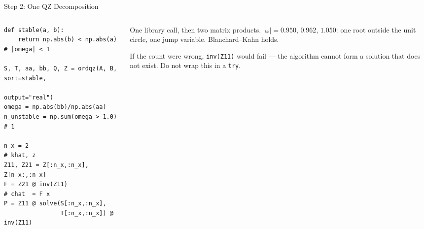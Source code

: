 \begin{frame}[fragile]{Step 2: One QZ Decomposition}
\begin{columns}[T]
\begin{column}{0.56\textwidth}
\begin{lstlisting}
def stable(a, b):
    return np.abs(b) < np.abs(a)   # |omega| < 1

S, T, aa, bb, Q, Z = ordqz(A, B, sort=stable,
                           output="real")
omega = np.abs(bb)/np.abs(aa)
n_unstable = np.sum(omega > 1.0)   # 1

n_x = 2                            # khat, z
Z11, Z21 = Z[:n_x,:n_x], Z[n_x:,:n_x]
F = Z21 @ inv(Z11)                 # chat  = F x
P = Z11 @ solve(S[:n_x,:n_x],
                T[:n_x,:n_x]) @ inv(Z11)
\end{lstlisting}
\end{column}
\begin{column}{0.41\textwidth}
\begin{conceptbox}[title=\textbf{The whole solve}]\small
One library call, then two matrix products. $|\omega|=0.950,\,0.962,\,\mathbf{1.050}$: one root outside the unit circle, one jump variable. Blanchard--Kahn holds.
\end{conceptbox}
\medskip
\begin{cautionbox}\footnotesize
If the count were wrong, \texttt{inv(Z11)} would fail --- the algorithm cannot form a solution that does not exist. Do not wrap this in a \texttt{try}.
\end{cautionbox}
\end{column}
\end{columns}
\vspace{1mm}
\end{frame}

